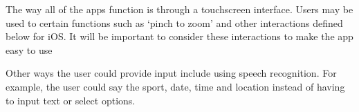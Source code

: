 The way all of the apps function is through a touchscreen interface. Users may
be used to certain functions such as `pinch to zoom' and other interactions
defined below for iOS\@. It will be important to consider these interactions to
make the app easy to use

Other ways the user could provide input include using speech recognition. For
example, the user could say the sport, date, time and location instead of
having to input text or select options.

